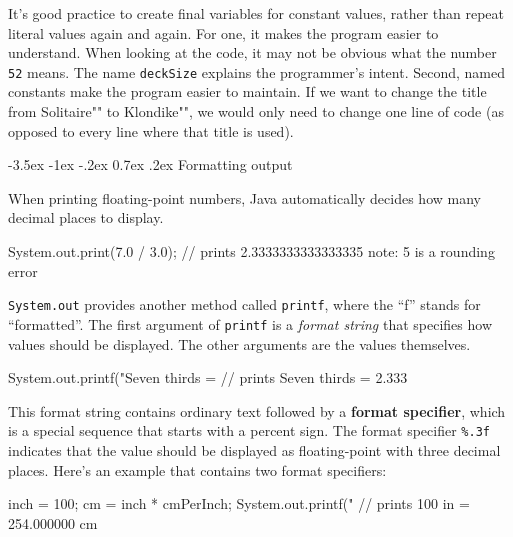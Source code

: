 \documentclass[12pt]{book}
\makeatletter
\theoremstyle{exercise}
\newcommand{\java}[1]{\verb"#1"}
\renewcommand{\section}{\@startsection {section}{1}{\z@}%
    {-3.5ex \@plus -1ex \@minus -.2ex}%
    {0.7ex \@plus.2ex}%
    {\normalfont\Large\bfseries}}
\newcommand{\java}[1]{\lstinline{#1}} %
\makeatother
\begin{document}
It's good practice to create final variables for constant values, rather than repeat literal values again and again.
For one, it makes the program easier to understand.
When looking at the code, it may not be obvious what the number \java{52} means.
The name \java{deckSize} explains the programmer's intent.
Second, named constants make the program easier to maintain.
If we want to change the title from \java{"Solitaire"} to \java{"Klondike"}, we would only need to change one line of code (as opposed to every line where that title is used).


\section{Formatting output}

When printing floating-point numbers, Java automatically decides how many decimal places to display.


\begin{code}
    System.out.print(7.0 / 3.0);
    // prints 2.3333333333333335   note: 5 is a rounding error
\end{code}


\java{System.out} provides another method called \java{printf}, where the ``f'' stands for ``formatted''.
The first argument of \java{printf} is a {\em format string} that specifies how values should be displayed.
The other arguments are the values themselves.

\begin{code}
    System.out.printf("Seven thirds = %
    // prints Seven thirds = 2.333
\end{code}


This format string contains ordinary text followed by a {\bf format specifier}, which is a special sequence that starts with a percent sign.
The format specifier \verb"%.3f" indicates that the value should be displayed as floating-point with three decimal places.
Here's an example that contains two format specifiers:

\begin{code}
   inch = 100;
   cm = inch * cmPerInch;
   System.out.printf("%
   // prints 100 in = 254.000000 cm
\end{code}
\end{document}
